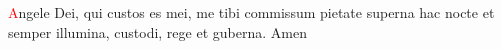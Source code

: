 \textcolor{red}{A}ngele Dei, qui custos es mei, me tibi commissum pietate superna hac nocte et semper illumina, custodi, rege et guberna. Amen